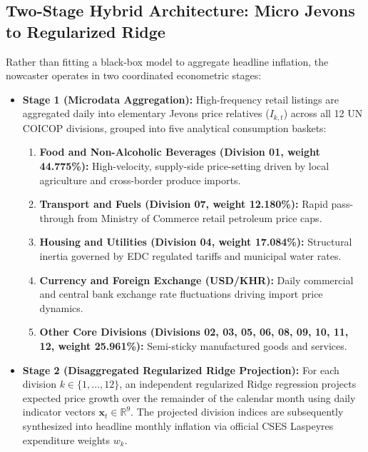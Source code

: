 \subsection{Two-Stage Hybrid Architecture: Micro Jevons to Regularized Ridge}
\hs Rather than fitting a black-box model to aggregate headline inflation, the nowcaster operates in two coordinated econometric stages:
\begin{itemize}
    \item \textbf{Stage 1 (Microdata Aggregation):} High-frequency retail listings are aggregated daily into elementary Jevons price relatives ($I_{k, t}$) across all 12 UN COICOP divisions, grouped into five analytical consumption baskets:
    \begin{enumerate}
        \item \textbf{Food and Non-Alcoholic Beverages (Division 01, weight 44.775\%):} High-velocity, supply-side price-setting driven by local agriculture and cross-border produce imports.
        \item \textbf{Transport and Fuels (Division 07, weight 12.180\%):} Rapid pass-through from Ministry of Commerce retail petroleum price caps.
        \item \textbf{Housing and Utilities (Division 04, weight 17.084\%):} Structural inertia governed by EDC regulated tariffs and municipal water rates.
        \item \textbf{Currency and Foreign Exchange (USD/KHR):} Daily commercial and central bank exchange rate fluctuations driving import price dynamics.
        \item \textbf{Other Core Divisions (Divisions 02, 03, 05, 06, 08, 09, 10, 11, 12, weight 25.961\%):} Semi-sticky manufactured goods and services.
    \end{enumerate}
    \item \textbf{Stage 2 (Disaggregated Regularized Ridge Projection):} For each division $k \in \{1, \dots, 12\}$, an independent regularized Ridge regression projects expected price growth over the remainder of the calendar month using daily indicator vectors $\mathbf{x}_t \in \mathbb{R}^9$. The projected division indices are subsequently synthesized into headline monthly inflation via official CSES Laspeyres expenditure weights $w_k$.
\end{itemize}

